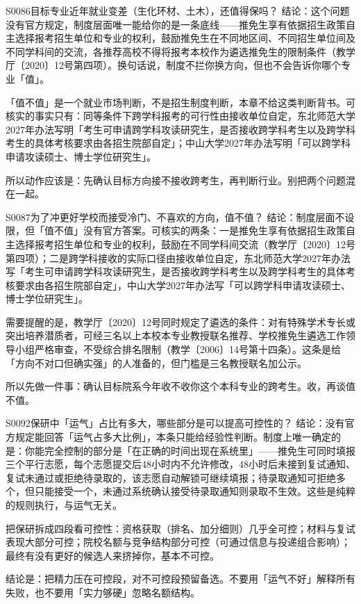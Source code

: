 \begin{qa}{S0086}{目标专业近年就业变差（生化环材、土木），还值得保吗？}
结论：这个问题没有官方规定，制度层面唯一能给你的是一条底线——推免生享有依据招生政策自主选择报考招生单位和专业的权利，鼓励推免生在不同地区间、不同招生单位间及不同学科间的交流，各推荐高校不得将报考本校作为遴选推免生的限制条件（教学厅〔2020〕12号第四项）。换句话说，制度不拦你换方向，但也不会告诉你哪个专业「值」。

「值不值」是一个就业市场判断，不是招生制度判断，本章不给这类判断背书。可核实的事实只有：同等条件下跨学科报考的可行性由接收单位自定，东北师范大学2027年办法写明「考生可申请跨学科攻读研究生，是否接收跨学科考生以及跨学科考生的具体考核要求由各招生院部自定」；中山大学2027年办法写明「可以跨学科申请攻读硕士、博士学位研究生」。

所以动作应该是：先确认目标方向接不接收跨考生，再判断行业。别把两个问题混在一起。
\end{qa}

\begin{qa}{S0087}{为了冲更好学校而接受冷门、不喜欢的方向，值不值？}
结论：制度层面不设限，但「值不值」没有官方答案。可核实的两条：一是推免生享有依据招生政策自主选择报考招生单位和专业的权利，鼓励在不同学科间交流（教学厅〔2020〕12号第四项）；二是跨学科接收的实际口径由接收单位自定，东北师范大学2027年办法写「考生可申请跨学科攻读研究生，是否接收跨学科考生以及跨学科考生的具体考核要求由各招生院部自定」，中山大学2027年办法写「可以跨学科申请攻读硕士、博士学位研究生」。

需要提醒的是，教学厅〔2020〕12号同时规定了遴选的条件：对有特殊学术专长或突出培养潜质者，可经三名以上本校本专业教授联名推荐、学校推免生遴选工作领导小组严格审查，不受综合排名限制（教学〔2006〕14号第十四条）。这条是给「方向不对口但确实强」的人准备的，但门槛是三名教授联名加公示。

所以先做一件事：确认目标院系今年收不收你这个本科专业的跨考生。收，再谈值不值。
\end{qa}

\begin{qa}{S0092}{保研中「运气」占比有多大，哪些部分是可以提高可控性的？}
结论：没有官方规定能回答「运气占多大比例」，本条只能给经验性判断。制度上唯一确定的是：你能完全控制的部分是「在正确的时间出现在系统里」——推免生可同时填报三个平行志愿，每个志愿提交后48小时内不允许修改，48小时后未接到复试通知、复试未通过或拒绝待录取的，该志愿自动解锁可继续填报；待录取通知可拒绝多个，但只能接受一个，未通过系统确认接受待录取通知则录取不生效。这些是纯粹的规则执行，与运气无关。

把保研拆成四段看可控性：资格获取（排名、加分细则）几乎全可控；材料与复试表现大部分可控；院校名额与竞争结构部分可控（可通过信息与投递组合影响）；最终有没有更好的候选人来挤掉你，基本不可控。

结论是：把精力压在可控段，对不可控段预留备选。不要用「运气不好」解释所有失败，也不要用「实力够硬」忽略名额结构。
\end{qa}

